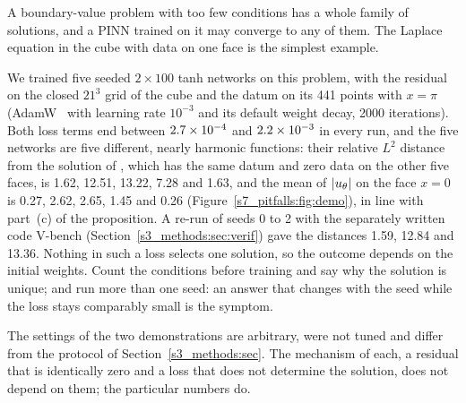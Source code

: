 A boundary-value problem with too few conditions has a whole family of solutions, and a PINN
trained on it may converge to any of them. The Laplace equation in the cube with data on one face
is the simplest example.

\begin{proposition}\label{s7_pitfalls:prop:nonunique}
\StmtNonunique
\end{proposition}

We trained five seeded $2\times100$ tanh networks on this problem, with the residual on the closed
$21^3$ grid of the cube and the datum on its 441 points with $x=\pi$ (AdamW~\citep{loshchilov2019}
with learning rate $10^{-3}$ and its default weight decay, 2000 iterations). Both loss terms end between $2.7\times 10^{-4}$ and $2.2\times 10^{-3}$ in
every run, and the five networks are five different, nearly harmonic functions: their relative
$L^2$ distance from the solution of \PLthree, which has the same datum and zero data on the other
five faces, is 1.62, 12.51, 13.22, 7.28 and 1.63, and the mean of $\lvert u_{\theta}\rvert$ on the face $x=0$
is 0.27, 2.62, 2.65, 1.45 and 0.26 (Figure~\ref{s7_pitfalls:fig:demo}), in line with part~(c) of
the proposition.
A re-run of seeds 0 to 2 with the separately written code \textsf{V-bench}
(Section~\ref{s3_methods:sec:verif}) gave the distances 1.59, 12.84 and 13.36. Nothing in such a
loss selects one solution, so the outcome depends on the initial weights. Count the conditions before training and say why the solution is unique; and run
more than one seed: an answer that changes with the seed while the loss stays comparably small is
the symptom.

The settings of the two demonstrations are arbitrary, were not tuned and differ from the
protocol of Section~\ref{s3_methods:sec}. The mechanism of each, a residual that is identically
zero and a loss that does not determine the solution, does not depend on them; the particular
numbers do.
